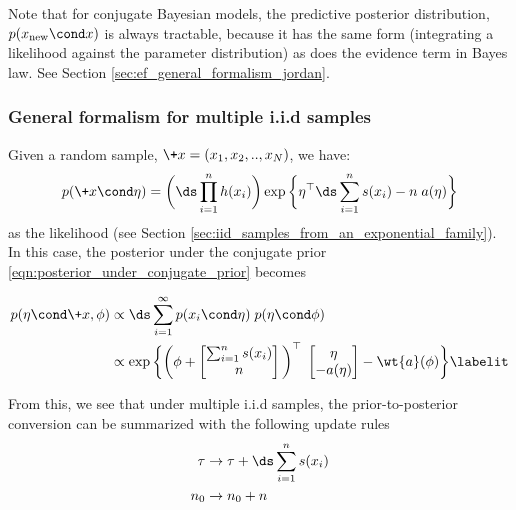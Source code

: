 \begin{remark}
Note that for conjugate Bayesian models, the predictive posterior distribution, $p(x_{\text{new}} \cond x)$ is always tractable, because it has the same form (integrating a likelihood against the parameter distribution) as does the evidence term in Bayes law.   See Section \ref{sec:ef_general_formalism_jordan}.
\end{remark}

\subsubsection{General formalism for multiple i.i.d samples} Given a random sample, $\+x=(x_1, x_2, .., x_N)$, we have:
\[ p(\+x \cond \eta) = \bigg( \ds\prod_{i=1}^n \carrierDensity(x_i)  \bigg) \exp \bigg\{ \eta^\top  \ds\sum_{i=1}^n \sufficientStatsFunction(x_i) - n \; \logNormalizerFunction(\eta) \bigg\} \]
as the likelihood (see Section \ref{sec:iid_samples_from_an_exponential_family}). In this case, the posterior under the conjugate prior \eqref{eqn:posterior_under_conjugate_prior} becomes

\begin{align*}
p(\eta \cond \+x, \phi) & \propto \ds\sum_{i=1}^\infty p(x_i \cond \eta) \; p(\eta \cond \phi) \\
&\propto \exp \bigg\{ \bigg( \phi + 
\begin{bmatrix} 
\sum_{i=1}^n \sufficientStatsFunction(x_i) \\
n \\
\end{bmatrix} \bigg)^\top \; 
\begin{bmatrix} 
\eta \\
-\logNormalizerFunction(\eta)
\end{bmatrix} 
- \wt{\logNormalizerFunction}(\phi)  \bigg\} 
\labelit \label{eqn:general_formalism_prior_to_posterior_conversion_after_multiple_iid_samples}
\end{align*}


From this, we see that under multiple i.i.d samples, the prior-to-posterior conversion can be summarized with the following update rules
\begin{subequations}
	\begin{align}
\tau & \to \tau + \ds\sum_{i=1}^n \sufficientStatsFunction(x_i) \\
n_0 & \to  n_0 + n 
\end{align} \label{eqn:general_formalism_prior_to_posterior_conversion}
\end{subequations}

